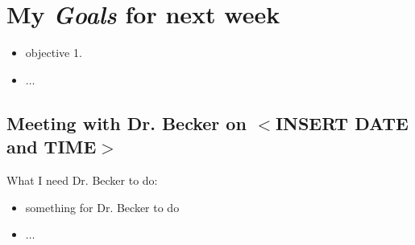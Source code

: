 \section{My \emph{Goals} for next week}

\begin{itemize}
\item objective 1. 
\item $\ldots$
\end{itemize}

\subsection{Meeting with Dr. Becker on $<$INSERT DATE and TIME$>$}

What I need Dr. Becker to do:
\begin{itemize}
\item something for Dr. Becker to do
\item $\ldots$
\end{itemize}


